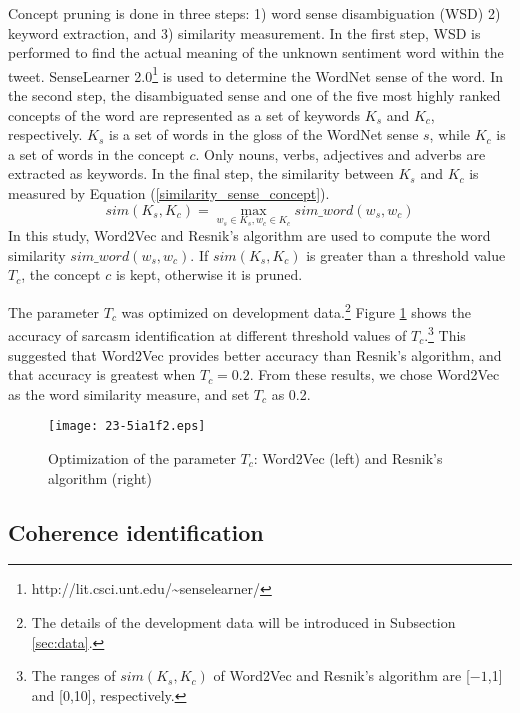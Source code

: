 \documentclass[english]{jnlp_1.4}
\begin{document}
Concept pruning is done in three steps: 1) word sense disambiguation (WSD) 2) keyword extraction, and 3) similarity measurement.
In the first step, WSD is performed to find the actual meaning of the unknown sentiment word within the tweet.
SenseLearner 2.0\footnote{http://lit.csci.unt.edu/\~{}senselearner/} is used to determine the WordNet sense of the word.
In the second step, the disambiguated sense and one of the five most highly ranked concepts of the word are represented as a set of keywords $K_s$ and $K_c$, respectively.
$K_s$ is a set of words in the gloss of the WordNet sense $s$, while $K_c$ is a set of words in the concept $c$.
Only nouns, verbs, adjectives and adverbs are extracted as keywords.
\pagebreak
In the final step, the similarity between $K_s$ and $K_c$ is measured by Equation (\ref{similarity_sense_concept}).
\begin{equation}
  \label{similarity_sense_concept}
  sim(K_s,K_c) = \max_{w_s \in K_s, w_c \in K_c} sim\_word(w_s,w_c)
\end{equation}
In this study, Word2Vec \cite{Mikolov_2013} and Resnik's algorithm \cite{Resnik_1995} are used to compute the word similarity $sim\_word(w_s,w_c)$.
If $sim(K_s,K_c)$ is greater than a threshold value $T_c$, the concept $c$ is kept, otherwise it is pruned.

The parameter $T_c$ was optimized on development data.\footnote{The details of the development data will be introduced in Subsection \ref{sec:data}.}\@ 
Figure \ref{result_resnik_word2vec_comparison} shows the accuracy of sarcasm identification at different threshold values of $T_c$.\footnote{The ranges of $sim(K_{s},K_{c})$ of Word2Vec and Resnik's algorithm are [$-1$,1] and [0,10], respectively.}\@ 
This suggested that Word2Vec provides better accuracy than Resnik's algorithm, and that accuracy is greatest when $T_c=0.2$.
From these results, we chose Word2Vec as the word similarity measure, and set $T_c$ as 0.2.

\begin{figure}[t]
\begin{center}
\texttt{[image: 23-5ia1f2.eps]}
\end{center}
\caption{Optimization of the parameter $T_c$: Word2Vec (left) and Resnik's algorithm (right)}
\label{result_resnik_word2vec_comparison}
\end{figure}


\subsection{Coherence identification}
\label{coherence_identification}
\end{document}
